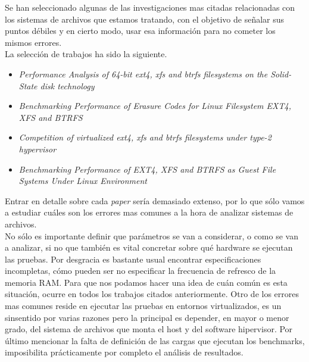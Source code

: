 Se han seleccionado algunas de las investigaciones mas citadas relacionadas con los sistemas de archivos que estamos tratando, con el objetivo de señalar sus puntos débiles y en cierto modo, usar esa información para no cometer los mismos errores. 
\\

La selección de trabajos ha sido la siguiente.
\begin{itemize}
    \item \textit{Performance Analysis of 64-bit ext4, xfs and btrfs filesystems on the Solid-State disk technology} \cite{Kljaji2016PerformanceAO}
    
    \item \textit{Benchmarking Performance of Erasure Codes for Linux Filesystem EXT4, XFS and BTRFS} \cite{10.1007/978-981-15-6584-7_32}
    
    \item \textit{Competition of virtualized ext4, xfs and btrfs filesystems under type-2 hypervisor} \cite{competitionvirtualized}
    
    \item \textit{Benchmarking Performance of EXT4, XFS and BTRFS as Guest File Systems Under Linux Environment} \cite{serbios}
\end{itemize}

Entrar en detalle sobre cada \textit{paper} sería demasiado extenso, por lo que sólo vamos a estudiar cuáles son los errores mas comunes a la hora de analizar sistemas de archivos.\\

No sólo es importante definir que parámetros se van a considerar, o como se van a analizar, si no que también es vital concretar sobre qué hardware se ejecutan las pruebas. Por desgracia es bastante usual encontrar especificaciones incompletas, cómo pueden ser no especificar la frecuencia de refresco de la memoria RAM. Para que nos podamos hacer una idea de cuán común es esta situación, ocurre en todos los trabajos citados anteriormente. Otro de los errores mas comunes reside en ejecutar las pruebas en entornos virtualizados, es un sinsentido por varias razones pero la principal es depender, en mayor o menor grado, del sistema de archivos que monta el host y del software hipervisor. Por último mencionar la falta de definición de las cargas que ejecutan los benchmarks, imposibilita prácticamente por completo el análisis de resultados.


